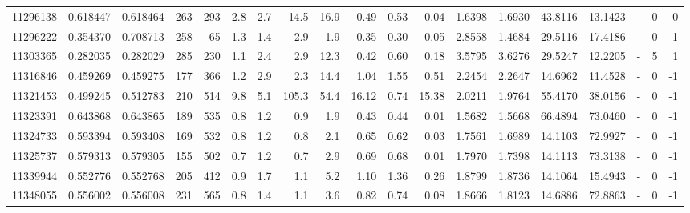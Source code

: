 \begin{tabular}{rrrrrrrrrrrrrrrrlrr}
  11296138 & 0.618447 &   0.618464 &  263 &  293 &      2.8 &      2.7 &    14.5 &     16.9 &       0.49 &        0.53 &        0.04 &  1.6398 &  1.6930 &   43.8116 &   13.1423 &             - &        0 &          0 \\
  11296222 & 0.354370 &   0.708713 &  258 &   65 &      1.3 &      1.4 &     2.9 &      1.9 &       0.35 &        0.30 &        0.05 &  2.8558 &  1.4684 &   29.5116 &   17.4186 &             - &        0 &         -1 \\
  11303365 & 0.282035 &   0.282029 &  285 &  230 &      1.1 &      2.4 &     2.9 &     12.3 &       0.42 &        0.60 &        0.18 &  3.5795 &  3.6276 &   29.5247 &   12.2205 &             - &        5 &          1 \\
  11316846 & 0.459269 &   0.459275 &  177 &  366 &      1.2 &      2.9 &     2.3 &     14.4 &       1.04 &        1.55 &        0.51 &  2.2454 &  2.2647 &   14.6962 &   11.4528 &             - &        0 &         -1 \\
  11321453 & 0.499245 &   0.512783 &  210 &  514 &      9.8 &      5.1 &   105.3 &     54.4 &      16.12 &        0.74 &       15.38 &  2.0211 &  1.9764 &   55.4170 &   38.0156 &             - &        0 &         -1 \\
  11323391 & 0.643868 &   0.643865 &  189 &  535 &      0.8 &      1.2 &     0.9 &      1.9 &       0.43 &        0.44 &        0.01 &  1.5682 &  1.5668 &   66.4894 &   73.0460 &             - &        0 &         -1 \\
  11324733 & 0.593394 &   0.593408 &  169 &  532 &      0.8 &      1.2 &     0.8 &      2.1 &       0.65 &        0.62 &        0.03 &  1.7561 &  1.6989 &   14.1103 &   72.9927 &             - &        0 &         -1 \\
  11325737 & 0.579313 &   0.579305 &  155 &  502 &      0.7 &      1.2 &     0.7 &      2.9 &       0.69 &        0.68 &        0.01 &  1.7970 &  1.7398 &   14.1113 &   73.3138 &             - &        0 &         -1 \\
  11339944 & 0.552776 &   0.552768 &  205 &  412 &      0.9 &      1.7 &     1.1 &      5.2 &       1.10 &        1.36 &        0.26 &  1.8799 &  1.8736 &   14.1064 &   15.4943 &             - &        0 &         -1 \\
  11348055 & 0.556002 &   0.556008 &  231 &  565 &      0.8 &      1.4 &     1.1 &      3.6 &       0.82 &        0.74 &        0.08 &  1.8666 &  1.8123 &   14.6886 &   72.8863 &             - &        0 &         -1 \\

\end{tabular}
